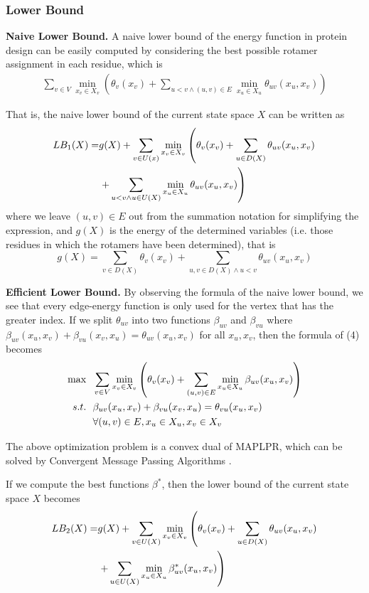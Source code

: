 \subsubsection{Lower Bound}

\noindent\textbf{Naive Lower Bound.}
A naive lower bound of the energy function in protein design can be easily computed by considering the best possible rotamer assignment in each residue, which is
\begin{align}
\sum_{v\in V}\min_{x_v\in X_v}\left(\theta_v(x_v)+\sum_{u<v\wedge(u,v)\in E}\min_{x_u\in X_u}\theta_{uv}(x_u,x_v)\right)
\end{align}

That is, the naive lower bound of the current state space $X$ can be written as
\begin{align}
LB_1(X)=&g(X)+\sum_{v\in U(x)}\min_{x_v\in X_v}\left(\theta_v(x_v)+\sum_{u\in D(X)}\theta_{uv}(x_u,x_v)\notag\right. \\
&\left.+\sum_{u<v\wedge u\in U(X)}\min_{x_u\in X_u}\theta_{uv}(x_u,x_v)\right)
\end{align}
where we leave $(u,v)\in E$ out from the summation notation for simplifying the expression, and $g(X)$ is the energy of the determined variables (i.e. those residues in which the rotamers have been determined), that is
\[
g(X) = \sum_{v\in D(X)}\theta_v(x_v)+\sum_{u,v\in D(X)\wedge u<v}\theta_{uv}(x_u,x_v)
\]

\noindent\textbf{Efficient Lower Bound.}
By observing the formula of the naive lower bound, we see that every edge-energy function is only used for the vertex that has the greater index. If we split $\theta_{uv}$ into two functions $\beta_{uv}$ and $\beta_{vu}$ where $\beta_{uv}(x_u,x_v)+\beta_{vu}(x_v,x_u)=\theta_{uv}(x_u,x_v)$ for all $x_u,x_v$, then the formula of (4) becomes
\begin{align}
\max & \ \ \sum_{v\in V}\min_{x_v\in X_v}\left(\theta_v(x_v)+\sum_{(u,v)\in E}\min_{x_u\in X_u}\beta_{uv}(x_u,x_v)\right) \\
s.t. & \ \ \beta_{uv}(x_u,x_v)+\beta_{vu}(x_v,x_u)=\theta_{vu}(x_u,x_v) \notag \\
& \ \ \forall (u,v)\in E,x_u\in X_u,x_v\in X_v \notag
\end{align}

The above optimization problem is a convex dual of MAPLPR, which can be solved by Convergent Message Passing Algorithms \cite[]{globerson2008fixing}.

If we compute the best functions $\beta^*$, then the lower bound of the current state space $X$ becomes
\begin{align}
LB_2(X)=&g(X)+\sum_{v\in U(X)}\min_{x_v\in X_v}\left(\theta_v(x_v)+\sum_{u\in D(X)}\theta_{uv}(x_u,x_v)\right. \notag \\
&\left.+\sum_{u\in U(X)}\min_{x_u\in X_u}\beta_{uv}^*(x_u,x_v)\right)
\end{align}

